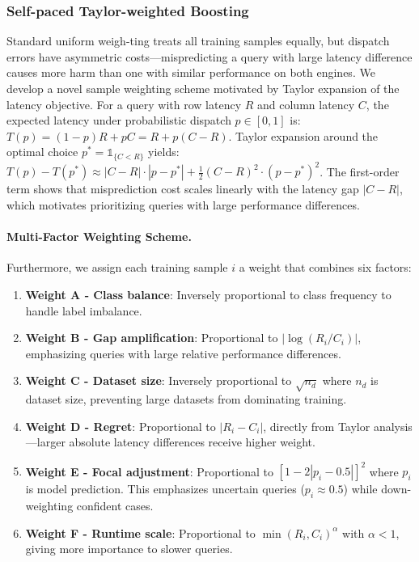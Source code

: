 \documentclass[sigconf, nonacm]{acmart}
\begin{document}
\subsubsection{Self-paced Taylor-weighted Boosting}\label{sssec:self_paced_boosting}

Standard uniform weigh-ting treats all training samples equally, but dispatch errors have asymmetric costs—mispredicting a query with large latency difference causes more harm than one with similar performance on both engines. We develop a novel sample weighting scheme motivated by Taylor expansion of the latency objective.
For a query with row latency $R$ and column latency $C$, the expected latency under probabilistic dispatch $p \in [0,1]$ is:
\(
T(p) = (1-p)R + pC = R + p(C-R)
\).
Taylor expansion around the optimal choice $p^* = \mathbb{1}_{\{C < R\}}$ yields:
\(
T(p) - T(p^*) \approx |C-R| \cdot |p-p^*| + \frac{1}{2}(C-R)^2 \cdot (p-p^*)^2
\).
The first-order term shows that misprediction cost scales linearly with the latency gap $|C-R|$, which motivates prioritizing queries with large performance differences.



\paragraph{Multi-Factor Weighting Scheme.}
Furthermore, we assign each training sample $i$ a weight that combines six factors:

\begin{enumerate}[leftmargin=*]
\item \textbf{Weight A - Class balance}: Inversely proportional to class frequency to handle label imbalance.

\item \textbf{Weight B - Gap amplification}: Proportional to $|\log(R_i/C_i)|$, emphasizing queries with large relative performance differences.

\item \textbf{Weight C - Dataset size}: Inversely proportional to $\sqrt{n_d}$ where $n_d$ is dataset size, preventing large datasets from dominating training.

\item \textbf{Weight D - Regret}: Proportional to $|R_i - C_i|$, directly from Taylor analysis—larger absolute latency differences receive higher weight.

\item \textbf{Weight E - Focal adjustment}: Proportional to $[1 - 2|p_i - 0.5|]^2$ where $p_i$ is model prediction. This emphasizes uncertain queries ($p_i \approx 0.5$) while down-weighting confident cases.

\item \textbf{Weight F - Runtime scale}: Proportional to $\min(R_i, C_i)^{\alpha}$ with $\alpha < 1$, giving more importance to slower queries.
\end{enumerate}
\end{document}
